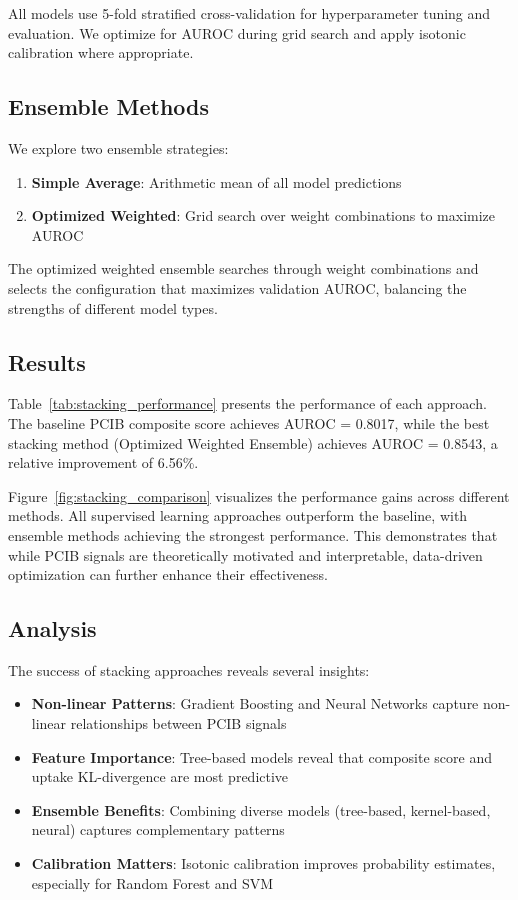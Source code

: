 All models use 5-fold stratified cross-validation for hyperparameter tuning and evaluation. 
We optimize for AUROC during grid search and apply isotonic calibration where appropriate.

\subsection{Ensemble Methods}
We explore two ensemble strategies:

\begin{enumerate}
  \item \textbf{Simple Average}: Arithmetic mean of all model predictions
  \item \textbf{Optimized Weighted}: Grid search over weight combinations to maximize AUROC
\end{enumerate}

The optimized weighted ensemble searches through weight combinations and selects 
the configuration that maximizes validation AUROC, balancing the strengths of different model types.

\subsection{Results}
Table~\ref{tab:stacking_performance} presents the performance of each approach. 
The baseline PCIB composite score achieves AUROC = 0.8017, while 
the best stacking method (Optimized Weighted Ensemble) achieves AUROC = 0.8543, 
a relative improvement of 6.56\%. 

Figure~\ref{fig:stacking_comparison} visualizes the performance gains across different methods. 
All supervised learning approaches outperform the baseline, with ensemble methods achieving 
the strongest performance. This demonstrates that while PCIB signals are theoretically motivated 
and interpretable, data-driven optimization can further enhance their effectiveness.

\subsection{Analysis}
The success of stacking approaches reveals several insights:

\begin{itemize}
  \item \textbf{Non-linear Patterns}: Gradient Boosting and Neural Networks capture non-linear relationships between PCIB signals
  \item \textbf{Feature Importance}: Tree-based models reveal that composite score and uptake KL-divergence are most predictive
  \item \textbf{Ensemble Benefits}: Combining diverse models (tree-based, kernel-based, neural) captures complementary patterns
  \item \textbf{Calibration Matters}: Isotonic calibration improves probability estimates, especially for Random Forest and SVM
\end{itemize}

